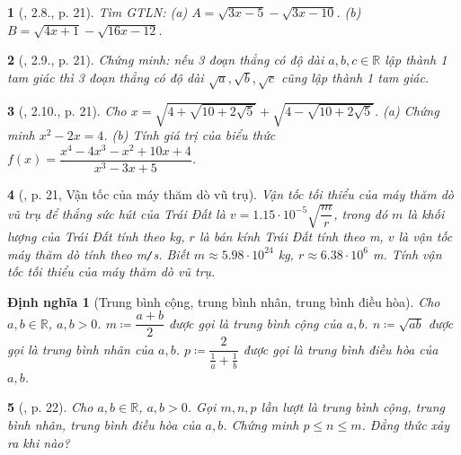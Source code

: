 \documentclass{article}
\newtheorem{baitoan}{}
\newtheorem{dinhnghia}{Định nghĩa}
\begin{document}
\begin{baitoan}[\cite{Binh_boi_duong_Toan_9_tap_1}, 2.8., p. 21]
	Tìm {\rm GTLN}: (a) $A = \sqrt{3x - 5} - \sqrt{3x - 10}$. (b) $B = \sqrt{4x + 1} - \sqrt{16x - 12}$.
\end{baitoan}

\begin{baitoan}[\cite{Binh_boi_duong_Toan_9_tap_1}, 2.9., p. 21]
	Chứng minh: nếu 3 đoạn thẳng có độ dài $a,b,c\in\mathbb{R}$ lập thành 1 tam giác thì 3 đoạn thẳng có độ dài $\sqrt{a},\sqrt{b},\sqrt{c}$ cũng lập thành 1 tam giác.
\end{baitoan}

\begin{baitoan}[\cite{Binh_boi_duong_Toan_9_tap_1}, 2.10., p. 21]
	Cho $x = \sqrt{4 + \sqrt{10 + 2\sqrt{5}}} + \sqrt{4 - \sqrt{10 + 2\sqrt{5}}}$. (a) Chứng minh $x^2 - 2x = 4$. (b) Tính giá trị của biểu thức $f(x) = \dfrac{x^4 - 4x^3 - x^2 + 10x + 4}{x^3 - 3x + 5}$.
\end{baitoan}

\begin{baitoan}[\cite{Binh_boi_duong_Toan_9_tap_1}, p. 21, Vận tốc của máy thăm dò vũ trụ]
	Vận tốc tối thiểu của máy thăm dò vũ trụ để thắng sức hút của Trái Đất là $v = 1.15\cdot10^{-5}\sqrt{\dfrac{m}{r}}$, trong đó $m$ là khối lượng của Trái Đất tính theo {\rm kg}, $r$ là bán kính Trái Đất tính theo {\rm m}, $v$ là vận tốc máy thăm dò tính theo {\rm m{\tt/}s}. Biết $m\approx5.98\cdot10^{24}$ {\rm kg}, $r\approx6.38\cdot10^6$ {\rm m}. Tính vận tốc tối thiểu của máy thăm dò vũ trụ.
\end{baitoan}

\begin{dinhnghia}[Trung bình cộng, trung bình nhân, trung bình điều hòa]
	Cho $a,b\in\mathbb{R}$, $a,b > 0$. $m\coloneqq\dfrac{a + b}{2}$ được gọi là {\rm trung bình cộng} của $a,b$. $n\coloneqq\sqrt{ab}$ được gọi là {\rm trung bình nhân} của $a,b$. $p\coloneqq\dfrac{2}{\frac{1}{a} + \frac{1}{b}}$ được gọi là {\rm trung bình điều hòa} của $a,b$.
\end{dinhnghia}

\begin{baitoan}[\cite{Binh_boi_duong_Toan_9_tap_1}, p. 22]
	Cho $a,b\in\mathbb{R}$, $a,b > 0$. Gọi $m,n,p$ lần lượt là trung bình cộng, trung bình nhân, trung bình điều hòa của $a,b$. Chứng minh $p\le n\le m$. Đẳng thức xảy ra khi nào?
\end{baitoan}
\end{document}
